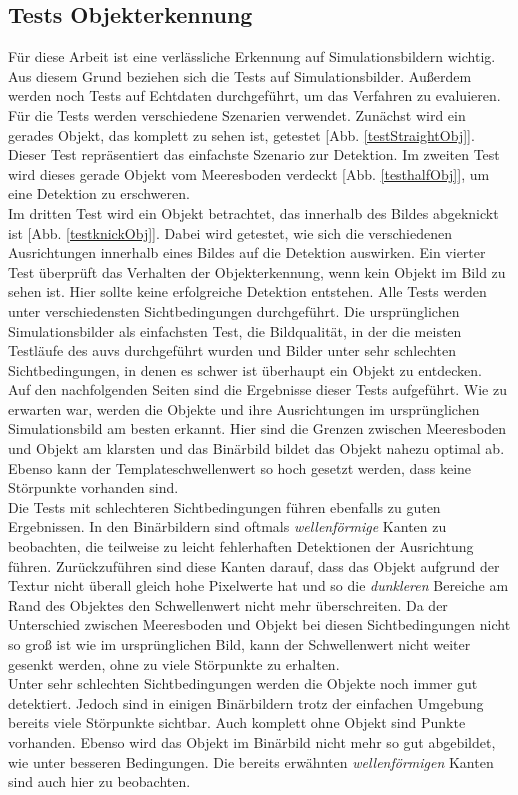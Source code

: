 \subsection{Tests Objekterkennung}
\label{sec_testObj}
Für diese Arbeit ist eine verlässliche Erkennung auf Simulationsbildern wichtig. Aus diesem Grund beziehen sich die Tests auf Simulationsbilder. Außerdem werden noch Tests auf Echtdaten durchgeführt, um das Verfahren zu evaluieren.\\
Für die Tests werden verschiedene Szenarien verwendet. Zunächst wird ein gerades Objekt, das komplett zu sehen ist, getestet [Abb. \ref{testStraightObj}]. Dieser Test repräsentiert das einfachste Szenario zur Detektion. Im zweiten Test wird dieses gerade Objekt vom Meeresboden verdeckt [Abb. \ref{testhalfObj}], um eine Detektion zu erschweren.\\
Im dritten Test wird ein Objekt betrachtet, das innerhalb des Bildes abgeknickt ist [Abb. \ref{testknickObj}]. Dabei wird getestet, wie sich die verschiedenen Ausrichtungen innerhalb eines Bildes auf die Detektion auswirken.
Ein vierter Test überprüft das Verhalten der Objekterkennung, wenn kein Objekt im Bild zu sehen ist. Hier sollte keine erfolgreiche Detektion entstehen. Alle Tests werden unter verschiedensten Sichtbedingungen durchgeführt. Die ursprünglichen Simulationsbilder als einfachsten Test, die Bildqualität, in der die meisten Testläufe des \gls{auv}s durchgeführt wurden und Bilder unter sehr schlechten Sichtbedingungen, in denen es schwer ist überhaupt ein Objekt zu entdecken.\\

Auf den nachfolgenden Seiten sind die Ergebnisse dieser Tests aufgeführt. Wie zu erwarten war, werden die Objekte und ihre Ausrichtungen im ursprünglichen Simulationsbild am besten erkannt. Hier sind die Grenzen zwischen Meeresboden und Objekt am klarsten und das Binärbild bildet das Objekt nahezu optimal ab. Ebenso kann der Templateschwellenwert so hoch gesetzt werden, dass keine Störpunkte vorhanden sind.\\
Die Tests mit schlechteren Sichtbedingungen führen ebenfalls zu guten Ergebnissen. In den Binärbildern sind oftmals \textit{wellenförmige} Kanten zu beobachten, die teilweise zu leicht fehlerhaften Detektionen der Ausrichtung führen. Zurückzuführen sind diese Kanten darauf, dass das Objekt aufgrund der Textur nicht überall gleich hohe Pixelwerte hat und so die \textit{dunkleren} Bereiche am Rand des Objektes den Schwellenwert nicht mehr überschreiten. Da der Unterschied zwischen Meeresboden und Objekt bei diesen Sichtbedingungen nicht so groß ist wie im ursprünglichen Bild, kann der Schwellenwert nicht weiter gesenkt werden, ohne zu viele Störpunkte zu erhalten.\\
Unter sehr schlechten Sichtbedingungen werden die Objekte noch immer gut detektiert. Jedoch sind in einigen Binärbildern trotz der einfachen Umgebung bereits viele Störpunkte sichtbar. Auch komplett ohne Objekt sind Punkte vorhanden. Ebenso wird das Objekt im Binärbild nicht mehr so gut abgebildet, wie unter besseren Bedingungen. Die bereits erwähnten \textit{wellenförmigen} Kanten sind auch hier zu beobachten.\\

